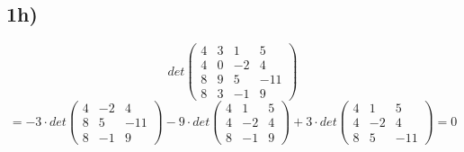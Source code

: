 \documentclass[10pt,a4paper]{article}
\begin{document}
\subsection*{1h)}
\[ det
\begin{pmatrix}
4 & 3 & 1 & 5\\
4 & 0 & -2 & 4\\
8 & 9 & 5 & -11\\
8 & 3 & -1 & 9
\end{pmatrix}
\]
\[ = -3 \cdot det
\begin{pmatrix}
4 & -2 & 4\\
8 & 5 & -11\\
8 & -1 & 9
\end{pmatrix}
-9 \cdot det 
\begin{pmatrix}
4 & 1 & 5\\
4 & -2 & 4\\
8 & -1 & 9
\end{pmatrix}
+3 \cdot det
\begin{pmatrix}
4 & 1 & 5\\
4 & -2 & 4\\
8 & 5 & -11
\end{pmatrix}
= 0
\]
\end{document}
